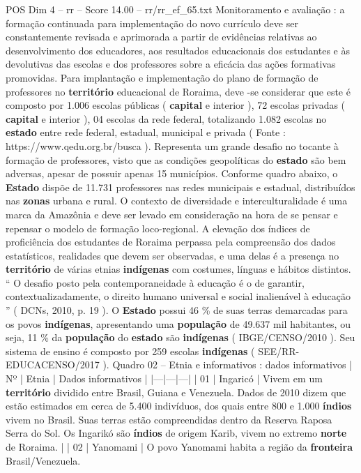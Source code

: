 \begin{textsample}{POS Dim 4 – rr – Score 14.00 – rr/rr\_ef\_65.txt}
Monitoramento e avaliação : a formação continuada para implementação do novo currículo deve ser constantemente revisada e aprimorada a partir de evidências relativas ao desenvolvimento dos educadores, aos resultados educacionais dos estudantes e às devolutivas das escolas e dos professores sobre a eficácia das ações formativas promovidas.
Para implantação e implementação do plano de formação de professores no \textbf{território} educacional de Roraima, deve -se considerar que este é composto por 1.006 escolas públicas ( \textbf{capital} e interior ), 72 escolas privadas ( \textbf{capital} e interior ), 04 escolas da rede federal, totalizando 1.082 escolas no \textbf{estado} entre rede federal, estadual, municipal e privada ( Fonte : https://www.qedu.org.br/busca ).
Representa um grande desafio no tocante à formação de professores, visto que as condições geopolíticas do \textbf{estado} são bem adversas, apesar de possuir apenas 15 municípios.
Conforme quadro abaixo, o \textbf{Estado} dispõe de 11.731 professores nas redes municipais e estadual, distribuídos nas \textbf{zonas} urbana e rural.
O contexto de diversidade e interculturalidade é uma marca da Amazônia e deve ser levado em consideração na hora de se pensar e repensar o modelo de formação loco-regional.
A elevação dos índices de proficiência dos estudantes de Roraima perpassa pela compreensão dos dados estatísticos, realidades que devem ser observadas, e uma delas é a presença no \textbf{território} de várias etnias \textbf{indígenas} com costumes, línguas e hábitos distintos. “ O desafio posto pela contemporaneidade à educação é o de garantir, contextualizadamente, o direito humano universal e social inalienável à educação ” ( DCNs, 2010, p. 19 ).
O \textbf{Estado} possui 46 \% de suas terras demarcadas para os povos \textbf{indígenas}, apresentando uma \textbf{população} de 49.637 mil habitantes, ou seja, 11 \% da \textbf{população} do \textbf{estado} são \textbf{indígenas} ( IBGE/CENSO/2010 ).
Seu sistema de ensino é composto por 259 escolas \textbf{indígenas} ( SEE/RR-EDUCACENSO/2017 ).
Quadro 02 – Etnia e informativos : dados informativos | Nº | Etnia | Dados informativos | |---|---|---| | 01 | Ingaricó | Vivem em um \textbf{território} dividido entre Brasil, Guiana e Venezuela.
Dados de 2010 dizem que estão estimados em cerca de 5.400 indivíduos, dos quais entre 800 e 1.000 \textbf{índios} vivem no Brasil.
Suas terras estão compreendidas dentro da Reserva Raposa Serra do Sol.
Os Ingarikó são \textbf{índios} de origem Karib, vivem no extremo \textbf{norte} de Roraima. | | 02 | Yanomami | O povo Yanomami habita a região da \textbf{fronteira} Brasil/Venezuela.

\end{textsample}
